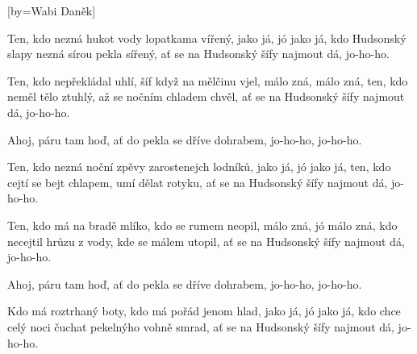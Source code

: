 [by={Wabi Daněk}]

\beginverse{}
Ten, kdo nezná hukot vody lopatkama vířený,
jako já, jó jako já,
kdo Hudsonský slapy nezná sírou pekla sířený,
ať se na Hudsonský šífy najmout dá, jo-ho-ho.
\endverse{}

\beginverse{}
\chordsoff{}
Ten, kdo nepřekládal uhlí, šíf když na mělčinu vjel,
málo zná, málo zná,
ten, kdo neměl tělo ztuhlý, až se nočním chladem chvěl,
ať se na Hudsonský šífy najmout dá, jo-ho-ho.
\chordson{}
\endverse{}

\beginchorus{}
Ahoj, páru tam hoď, ať do pekla se dříve dohrabem,
jo-ho-ho, jo-ho-ho.
\endchorus{}

\beginverse{}
\chordsoff{}
Ten, kdo nezná noční zpěvy zarostenejch lodníků,
jako já, jó jako já,
ten, kdo cejtí se bejt chlapem, umí dělat rotyku,
ať se na Hudsonský šífy najmout dá, jo-ho-ho.
\chordson{}
\endverse{}

\beginverse{}
\chordsoff{}
Ten, kdo má na bradě mlíko, kdo se rumem neopil,
málo zná, jó málo zná,
kdo necejtil hrůzu z vody, kde se málem utopil,
ať se na Hudsonský šífy najmout dá, jo-ho-ho.
\chordson{}
\endverse{}

\repeatingchorus{}
\beginchorus{}
\chordsoff{}
Ahoj, páru tam hoď, ať do pekla se dříve dohrabem,
jo-ho-ho, jo-ho-ho.
\chordson{}
\endchorus{}

\beginverse{}
\chordsoff{}
Kdo má roztrhaný boty, kdo má pořád jenom hlad,
jako já, jó jako já,
kdo chce celý noci čuchat pekelnýho vohně smrad,
ať se na Hudsonský šífy najmout dá, jo-ho-ho.
\chordson{}
\endverse{}

